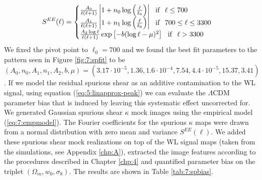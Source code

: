 \begin{equation}
\label{eq:7:empmodel}
S^{EE}(\ell) = 
\begin{cases}
\frac{A_0}{\ell(\ell+1)}\left\vert1+n_0\log\left(\frac{\ell}{\ell_0}\right)\right\vert \,\,\,\,  {\rm if } \,\,\,\, \ell\leq 700 \\
\frac{A_1}{\ell(\ell+1)}\left\vert1+n_1\log\left(\frac{\ell}{\ell_0}\right)\right\vert \,\,\,\,  {\rm if } \,\,\,\, 700\leq\ell\leq 3300 \\
\frac{A_2\log{\ell}}{\ell(\ell+1)}\exp\left[-b(\log{\ell}-\mu)^2\right] \,\,\,\,  {\rm if } \,\,\,\, \ell > 3300
\end{cases} 
\end{equation}
%
We fixed the pivot point to $\ell_0=700$ and we found the best fit parameters to the pattern seen in Figure \ref{fig:7:spfit} to be $(A_0,n_0,A_1,n_1,A_2,b,\mu)=(3.17\cdot 10^{-5},1.36,1.6\cdot 10^{-4},7.54,4.4\cdot 10^{-5},15.37,3.41)$. If we model the residual spurious shear as an additive contamination to the WL signal, using equation (\ref{eq:5:linapprox-peak}) we can evaluate the $\Lambda$CDM parameter bias that is induced by leaving this systematic effect uncorrected for. We generated Gaussian spurious shear $\kappa$ mock images using the empirical model (\ref{eq:7:empmodel}). The Fourier coefficients for the spurious $\kappa$ maps were drawn from a normal distribution with zero mean and variance $S^{EE}(\ell)$. We added these spurious shear mock realizations on top of the WL signal maps (taken from the  simulations, see Appendix \ref{chp:A}), extracted the image features according to the procedures described in Chapter \ref{chp:4} and quantified parameter bias on the triplet $(\Omega_m,w_0,\sigma_8)$. The results are shown in Table \ref{tab:7:spbias}.
%
